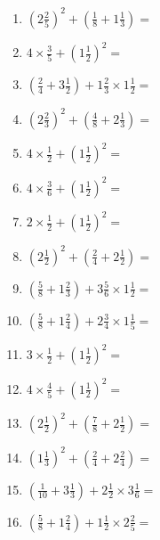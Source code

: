 \documentclass[12pt]{article}
\begin{document}
\begin{enumerate}
\newpage
\item \large $ (2 \frac{2}{5})^2 + (\frac{1}{8} + 1 \frac{1}{3}) = $ \vspace{1.8cm}
\item \large $ 4 \times \frac{3}{5} + (1 \frac{1}{2})^2 = $ \vspace{1.8cm}
\item \large $ (\frac{2}{4} + 3 \frac{1}{2}) + 1 \frac{2}{3} \times 1 \frac{1}{2} = $ \vspace{1.8cm}
\item \large $ (2 \frac{2}{3})^2 + (\frac{4}{8} + 2 \frac{1}{3}) = $ \vspace{1.8cm}
\item \large $ 4 \times \frac{1}{2} + (1 \frac{1}{2})^2 = $ \vspace{1.8cm}
\item \large $ 4 \times \frac{3}{6} + (1 \frac{1}{2})^2 = $ \vspace{1.8cm}
\item \large $ 2 \times \frac{1}{2} + (1 \frac{1}{2})^2 = $ \vspace{1.8cm}
\item \large $ (2 \frac{1}{2})^2 + (\frac{2}{4} + 2 \frac{1}{2}) = $ \vspace{1.8cm}
\item \large $ (\frac{5}{8} + 1 \frac{2}{3}) + 3 \frac{5}{6} \times 1 \frac{1}{2} = $ \vspace{1.8cm}
\item \large $ (\frac{5}{8} + 1 \frac{2}{4}) + 2 \frac{3}{4} \times 1 \frac{1}{5} = $ \vspace{1.8cm}
\newpage
\item \large $ 3 \times \frac{1}{2} + (1 \frac{1}{2})^2 = $ \vspace{1.8cm}
\item \large $ 4 \times \frac{4}{5} + (1 \frac{1}{2})^2 = $ \vspace{1.8cm}
\item \large $ (2 \frac{1}{2})^2 + (\frac{7}{8} + 2 \frac{1}{2}) = $ \vspace{1.8cm}
\item \large $ (1 \frac{1}{3})^2 + (\frac{2}{4} + 2 \frac{2}{4}) = $ \vspace{1.8cm}
\item \large $ (\frac{1}{10} + 3 \frac{1}{3}) + 2 \frac{1}{2} \times 3 \frac{1}{6} = $ \vspace{1.8cm}
\item \large $ (\frac{5}{8} + 1 \frac{2}{4}) + 1 \frac{1}{2} \times 2 \frac{2}{5} = $ \vspace{1.8cm}

\end{enumerate}
\end{document}
